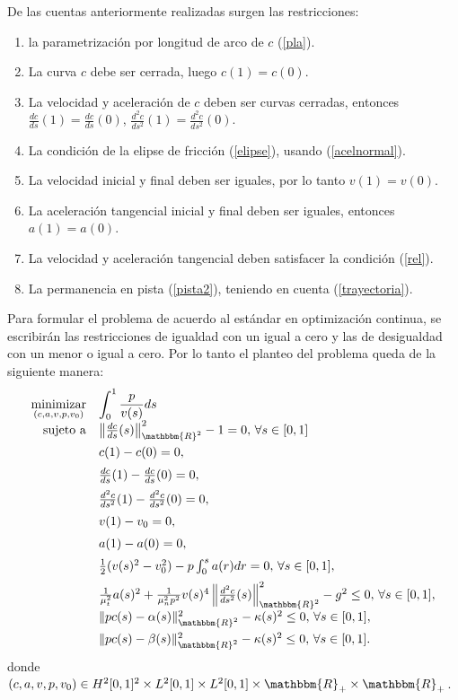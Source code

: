 \documentclass[a4paper,10pt]{book}
\newcommand{\R}{\mathbbm{R}}
\begin{document}
De las cuentas anteriormente realizadas surgen las restricciones:
\begin{enumerate}
\item la parametrización por longitud de arco de $c$ (\ref{pla}).
\item La curva $c$ debe ser cerrada, luego $c(1)=c(0)$.
\item La velocidad y aceleraci\'on de $c$ deben ser curvas cerradas, entonces $\frac{dc}{ds}(1)=\frac{dc}{ds}(0)$, $\frac{d^2c}{ds^2}(1)=\frac{d^2c}{ds^2}(0)$.

\item La condición de la elipse de fricción (\ref{elipse}), usando (\ref{acelnormal}).

\item La velocidad inicial y final deben ser iguales, por lo tanto $v(1)=v(0)$.

\item La aceleraci\'on tangencial inicial y final deben ser iguales, entonces $a(1)=a(0)$. 

\item La velocidad y aceleraci\'on tangencial deben satisfacer la condición (\ref{rel}).

\item La permanencia en pista (\ref{pista2}), teniendo en cuenta (\ref{trayectoria}).
\end{enumerate}

Para formular el problema de acuerdo al est\'andar en optimizaci\'on continua, se escribirán las restricciones de igualdad con un igual a cero y las de desigualdad con un menor o igual a cero. Por lo tanto el planteo del problema queda de la siguiente manera:
\[
\begin{array}{rl}
\displaystyle \mathop{\mathrm{minimizar}}_{(c,a,v,p,v_0)} & \displaystyle \int_{0}^{1} \frac{p}{v(s)}ds \\
 \mathrm{sujeto \ a} & \left\|\frac{dc}{ds}(s)\right\|_{\R^2}^2-1=0,\,\forall s\in[0,1]\\[2mm]
                     & c(1)-c(0)=0,\\[2mm]
                     & \frac{dc}{ds}(1)-\frac{dc}{ds}(0)=0,\\[2mm]
                     & \frac{d^2c}{ds^2}(1)-\frac{d^2c}{ds^2}(0)=0,\\[2mm]
                     & v(1)-v_0=0,\\[2mm]
                     & a(1)-a(0)=0,\\[2mm]
                     &  \frac{1}{2}(v(s)^2-v_0^2)-p\int_0^s a(r)dr=0,\, \forall s\in[0,1],\\ [2mm]
                     & \frac{1}{\mu_t^2} a(s)^2 + \frac{1}{\mu_n^2 p^2}v(s)^4\left\| \frac{d^2 c}{ds^2}(s) \right\|_{\R^2}^2-g^2\leq 0,\,\forall s\in[0,1],\\[2mm]
                     &  \|pc(s)-\alpha(s)\|_{\R^2}^2-\kappa(s)^2 \leq 0,\,\forall s\in[0,1], \\[2mm]
                     &  \|pc(s)-\beta(s)\|_{\R^2}^2-\kappa(s)^2 \leq 0,\, \forall s\in[0,1].
  \end{array}
\]
donde $(c,a,v,p,v_0)\in H^2[0,1]^2\times L^2[0,1]\times L^2[0,1]\times\R_+\times \R_+$.
\end{document}
